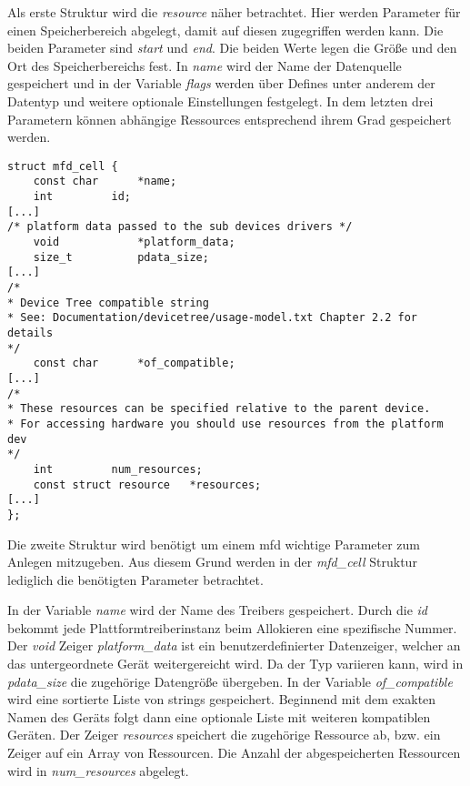 Als erste Struktur wird die \textit{resource} näher betrachtet. Hier werden Parameter für einen Speicherbereich abgelegt, damit auf diesen zugegriffen werden kann. 
Die beiden Parameter sind \textit{start} und \textit{end}. Die beiden Werte legen die Größe und den Ort des Speicherbereichs fest. 
In \textit{name} wird der Name der Datenquelle gespeichert und in der Variable \textit{flags} werden über Defines unter anderem der Datentyp und weitere optionale Einstellungen festgelegt.
In dem letzten drei Parametern können abhängige Ressources entsprechend ihrem Grad gespeichert werden. \\

\begin{lstfloat}
\begin{lstlisting}
struct mfd_cell {
	const char		*name;
	int			id;
[...]
/* platform data passed to the sub devices drivers */
	void			*platform_data;
	size_t			pdata_size;	
[...]	
/*
* Device Tree compatible string
* See: Documentation/devicetree/usage-model.txt Chapter 2.2 for details
*/
	const char		*of_compatible;	
[...]	
/*
* These resources can be specified relative to the parent device.
* For accessing hardware you should use resources from the platform dev
*/
	int			num_resources;
	const struct resource	*resources;	
[...]
};
\end{lstlisting}
\end{lstfloat}

Die zweite Struktur wird benötigt um einem \ac{mfd} wichtige Parameter zum Anlegen mitzugeben. Aus diesem Grund werden in der \textit{mfd\_cell} Struktur lediglich die benötigten Parameter betrachtet. 

In der Variable \textit{name} wird der Name des Treibers gespeichert. Durch die \textit{id} bekommt jede Plattformtreiberinstanz beim Allokieren eine spezifische Nummer.
Der \textit{void} Zeiger \textit{platform\_data} ist ein benutzerdefinierter Datenzeiger, welcher an das untergeordnete Gerät weitergereicht wird. Da der Typ variieren kann, wird in \textit{pdata\_size} die zugehörige Datengröße übergeben. 
In der Variable \textit{of\_compatible} wird eine sortierte Liste von strings gespeichert. Beginnend mit dem exakten Namen des Geräts folgt dann eine optionale Liste mit weiteren kompatiblen Geräten. \cite[Zeile 116ff.]{linuxsourcedocu} %
Der Zeiger \textit{resources} speichert die zugehörige Ressource ab, bzw. ein Zeiger auf ein Array von Ressourcen. Die Anzahl der abgespeicherten Ressourcen wird in \textit{num\_resources} abgelegt.\\

